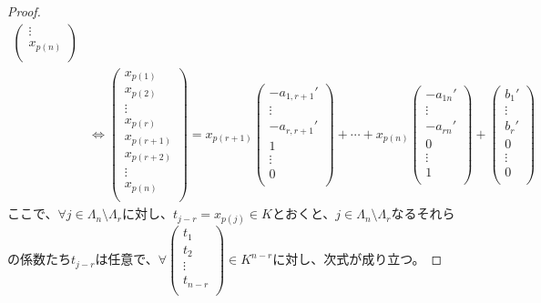 \documentclass[dvipdfmx]{jsarticle}
\begin{document}
\begin{proof}
\begin{align*}
\begin{pmatrix}
 \vdots \\
x_{p(n)} \\
\end{pmatrix}\\
&\Leftrightarrow \begin{pmatrix}
x_{p(1)} \\
x_{p(2)} \\
 \vdots \\
x_{p(r)} \\
x_{p(r + 1)} \\
x_{p(r + 2)} \\
 \vdots \\
x_{p(n)} \\
\end{pmatrix} = x_{p(r + 1)}\begin{pmatrix}
 - a_{1,r + 1}' \\
 \vdots \\
 - a_{r,r + 1}' \\
1 \\
 \vdots \\
0 \\
\end{pmatrix} + \cdots + x_{p(n)}\begin{pmatrix}
 - a_{1n}' \\
 \vdots \\
 - a_{rn}' \\
0 \\
 \vdots \\
1 \\
\end{pmatrix} + \begin{pmatrix}
b_{1}' \\
 \vdots \\
b_{r}' \\
0 \\
 \vdots \\
0 \\
\end{pmatrix}
\end{align*}
ここで、$\forall j \in \varLambda_{n} \setminus \varLambda_{r}$に対し、$t_{j - r} = x_{p(j)} \in K$とおくと、$j \in \varLambda_{n} \setminus \varLambda_{r}$なるそれらの係数たち$t_{j - r}$は任意で、$\forall\begin{pmatrix}
t_{1} \\
t_{2} \\
 \vdots \\
t_{n - r} \\
\end{pmatrix} \in K^{n - r}$に対し、次式が成り立つ。

\end{proof}
\end{document}
